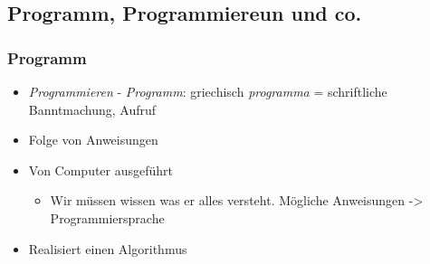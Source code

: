 \documentclass[11pt]{article}
\begin{document}
\subsection{Programm, Programmiereun und co.}
\label{sec:orgf81f35c}
\subsubsection{Programm}
\label{sec:org6757c47}
\begin{itemize}
\item \emph{Programmieren} - \emph{Programm}: griechisch \emph{programma} = schriftliche Banntmachung, Aufruf\\
\item Folge von Anweisungen\\
\item Von Computer ausgeführt\\
\begin{itemize}
\item Wir müssen wissen was er alles versteht. Mögliche Anweisungen -> Programmiersprache\\
\end{itemize}
\item Realisiert einen Algorithmus\\
\end{itemize}
\end{document}
